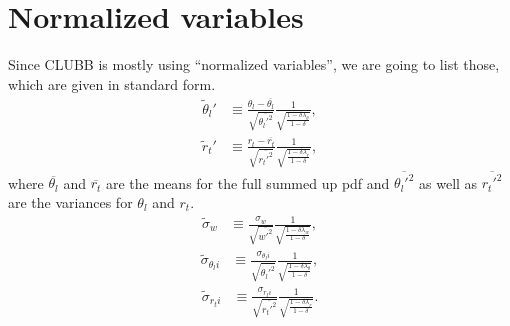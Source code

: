 \section{Normalized variables}\label{sec:normvars}

Since \gls{CLUBB} is mostly using \enquote{normalized variables},
we are going to list those, which are given in standard form.
\begin{align}
    \label{eq:theta_l_prime_tilde}
    \tilde{\theta}_l'
    &\equiv \frac{\theta_l - \overline{\theta_l}}{\sqrt{\overline{\theta_l'^2}}}
    \frac{1}{\sqrt{\frac{1 - \delta \lambda_\theta}{1 - \delta}}},
\end{align}
\begin{align}
    \label{eq:r_t_prime_tilde}
    \tilde{r}_t'
    &\equiv \frac{r_t - \overline{r_t}}{\sqrt{\overline{r_t'^2}}}
    \frac{1}{\sqrt{\frac{1 - \delta \lambda_r}{1 - \delta}}},
\end{align}
where $\overline{\theta_l}$ and $\overline{r_t}$ are the means for the full summed up \gls{pdf}
and $\overline{\theta_l'^2}$ as well as $\overline{r_t'^2}$ are the variances for $\theta_l$ and $r_t$.
\begin{align}
    \label{eq:sigma_w_tilde}
    \tilde{\sigma}_w
    &\equiv \frac{\sigma_w}{\sqrt{\overline{w'^2}}}
    \frac{1}{\sqrt{\frac{1-\delta\lambda_w}{1-\delta}}},
\end{align}
\begin{align}
    \label{eq:sigma_theta_l_i_tilde}
    \tilde{\sigma}_{\theta_l i}
    &\equiv \frac{\sigma_{\theta_l i}}{\sqrt{\overline{\theta_l'^2}}}
    \frac{1}{\sqrt{\frac{1-\delta\lambda_\theta}{1-\delta}}},
\end{align}
\begin{align}
    \label{eq:sigma_r_t_i_tilde}
    \tilde{\sigma}_{r_t i}
    &\equiv \frac{\sigma_{r_t i}}{\sqrt{\overline{r_t'^2}}}
    \frac{1}{\sqrt{\frac{1-\delta\lambda_r}{1-\delta}}}.
\end{align}